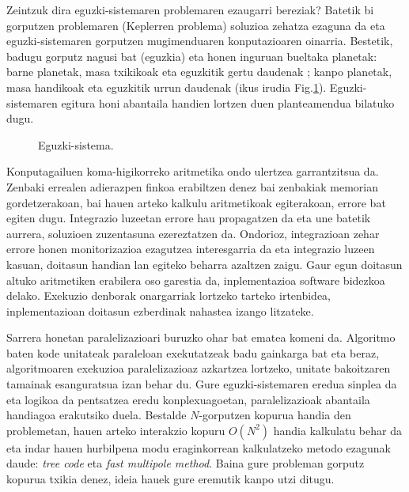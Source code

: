 Zeintzuk dira eguzki-sistemaren problemaren ezaugarri bereziak? Batetik bi gorputzen problemaren (Keplerren problema) soluzioa zehatza ezaguna da eta eguzki-sistemaren gorputzen mugimenduaren konputazioaren oinarria. Bestetik,  badugu gorputz nagusi bat (eguzkia) eta honen inguruan bueltaka planetak: barne planetak, masa txikikoak eta eguzkitik gertu daudenak ; kanpo planetak, masa handikoak eta eguzkitik urrun daudenak (ikus irudia Fig.\ref{fig:plot1}). Eguzki-sistemaren egitura honi abantaila handien lortzen duen planteamendua bilatuko dugu.



\begin{figure}[h]
\centering
{}
\caption[Eguzki-sistema]{\small Eguzki-sistema.}
\label{fig:plot1}
\end{figure}    
   
Konputagailuen koma-higikorreko aritmetika ondo ulertzea garrantzitsua da. Zenbaki errealen adierazpen finkoa erabiltzen denez bai zenbakiak memorian gordetzerakoan, bai hauen arteko kalkulu aritmetikoak egiterakoan, errore bat egiten dugu. Integrazio luzeetan errore hau propagatzen da eta une batetik aurrera, soluzioen zuzentasuna ezereztatzen da. Ondorioz, integrazioan zehar errore honen monitorizazioa ezagutzea interesgarria da eta integrazio luzeen kasuan, doitasun handian lan egiteko beharra azaltzen zaigu. Gaur egun doitasun altuko aritmetiken erabilera oso garestia da, inplementazioa software bidezkoa delako. Exekuzio denborak onargarriak lortzeko tarteko irtenbidea, inplementazioan doitasun ezberdinak nahastea izango litzateke.       

Sarrera honetan paralelizazioari buruzko ohar bat ematea komeni da. Algoritmo baten kode unitateak paraleloan exekutatzeak badu gainkarga bat eta beraz,  algoritmoaren exekuzioa paralelizazioaz azkartzea lortzeko,  unitate bakoitzaren tamainak esanguratsua izan behar du. Gure eguzki-sistemaren eredua sinplea da eta logikoa da pentsatzea eredu konplexuagoetan, paralelizazioak abantaila handiagoa erakutsiko duela. Bestalde $N$-gorputzen kopurua handia den problemetan, hauen arteko interakzio kopuru $O(N^2)$ handia kalkulatu behar da eta indar hauen hurbilpena modu eraginkorrean kalkulatzeko metodo ezagunak daude: \textit {tree code}\cite{Barnes1986} eta \textit {fast multipole method}\cite{Carrier1988}. Baina gure probleman gorputz kopurua txikia denez, ideia hauek gure eremutik kanpo utzi ditugu. 

